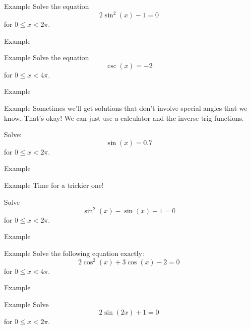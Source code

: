 \documentclass[presentation]{beamer}
\begin{document}
\begin{frame}[label={sec:org9f2c26c}]{Example}
Solve the equation
\[
2\sin^2(x) - 1 =0\]
for \(0 \le x < 2\pi.\)

\vspace{10in}
\end{frame}

\begin{frame}[label={sec:org81b511b}]{Example}
\end{frame}

\begin{frame}[label={sec:orgd2f0bcd}]{Example}
Solve the equation
\[
\csc(x) = -2 \]
for \(0 \le x < 4\pi.\)
\vspace{10in}
\end{frame}

\begin{frame}[label={sec:org6f1f7a6}]{Example}
\end{frame}

\begin{frame}[label={sec:org1161b40}]{Example}
Sometimes we'll get solutions that don't involve special angles that we know,
That's okay!  We can just use a calculator and the inverse trig functions.

Solve:
\[
\sin(x) = 0.7\]
for \(0 \le x < 2\pi.\)

\vspace{10in}
\end{frame}

\begin{frame}[label={sec:org9a8e952}]{Example}
\end{frame}

\begin{frame}[label={sec:org30161f1}]{Example}
Time for a trickier one!

Solve
\[
\sin^2(x) - \sin(x) - 1 = 0\]
for \(0 \le x < 2\pi.\)


\vspace{10in}
\end{frame}

\begin{frame}[label={sec:orgc4f1bf5}]{Example}
\end{frame}

\begin{frame}[label={sec:orgffb62d5}]{Example}
Solve the following equation exactly:
\[
2\cos^2(x) + 3\cos(x) - 2 = 0\]
for \(0 \le x < 4\pi.\)
\vspace{10in}
\end{frame}

\begin{frame}[label={sec:orgb6b617b}]{Example}
\end{frame}

\begin{frame}[label={sec:orga3f3837}]{Example}
Solve
\[
2\sin(2x) + 1 = 0\]
for \(0 \le x < 2 \pi\).
\vspace{10in}
\end{frame}
\end{document}
